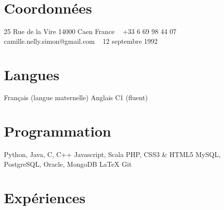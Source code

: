 \documentclass[]{cv-style}          %
\begin{document}
\lastupdated


\begin{aside}
%
\section{Coordonnées}
25 Rue de la Vire
14000 Caen
France
~
+33 6 69 98 44 07
camille.nelly.simon@gmail.com
~
12 septembre 1992
%
\section{Langues}
Français (langue maternelle)
Anglais C1 (fluent)
%
\section{Programmation}
Python, Java, C, C++
Javascript, Scala
PHP, CSS3 \& HTML5
MySQL, PostgreSQL, Oracle, MongoDB
\LaTeX{}
Git
%
\end{aside}





\section{Expériences}
\end{document}
